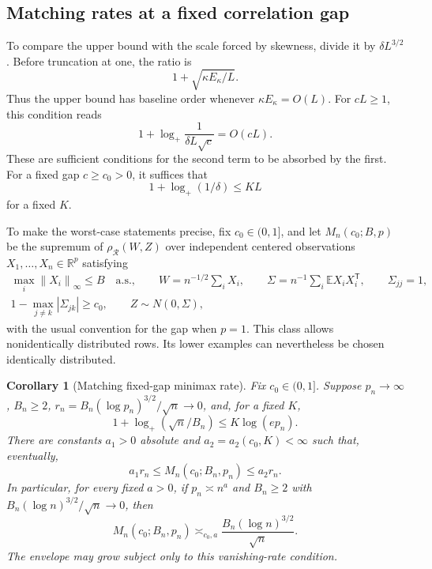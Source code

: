 \documentclass[11pt,a4paper]{article}
\newtheorem{corollary}{Corollary}
\theoremstyle{remark}
\newcommand{\E}{\mathbb E}
\newcommand{\R}{\mathbb R}
\newcommand{\norm}[1]{\left\lVert#1\right\rVert}
\newcommand{\rh}{\rho_{\mathcal R}}
\begin{document}
\subsection{Matching rates at a fixed correlation gap}
\label{opt:matching}

To compare the upper bound with the scale forced by skewness,
divide it by \(\delta L^{3/2}\). Before truncation at one, the ratio is
\[
 1+\sqrt{\kappa E_\kappa/L}.
\]
Thus the upper bound has baseline order whenever
\(\kappa E_\kappa=O(L)\). For \(cL\ge1\), this condition reads
\[
 1+\log_+\frac1{\delta L\sqrt c}=O(cL).
\]
These are sufficient conditions for the second term to be absorbed
by the first. For a fixed gap \(c\ge c_0>0\), it suffices that
\begin{equation}
 1+\log_+(1/\delta)\le K L
 \label{opt:dimension-absorbs-log}
\end{equation}
for a fixed \(K\).

To make the worst-case statements precise, fix \(c_0\in(0,1]\), and let
\(M_n(c_0;B,p)\) be the supremum of \(\rh(W,Z)\) over independent
centered observations \(X_1,\ldots,X_n\in\R^p\) satisfying
\begin{equation}
 \begin{gathered}
 \max_i\norm{X_i}_\infty\le B\quad\text{a.s.},\qquad
 W=n^{-1/2}\sum_iX_i,\qquad
 \Sigma=n^{-1}\sum_i\E X_iX_i^{\mathsf T},\qquad
 \Sigma_{jj}=1,\\
 1-\max_{j\ne k}|\Sigma_{jk}|\ge c_0,
 \qquad Z\sim N(0,\Sigma),
 \end{gathered}
 \label{opt:minimax-class}
\end{equation}
with the usual convention for the gap when \(p=1\). This class allows
nonidentically distributed rows. Its lower examples can nevertheless
be chosen identically distributed.

\begin{corollary}[Matching fixed-gap minimax rate]
\label{opt:fixed-gap-minimax}
Fix \(c_0\in(0,1]\). Suppose \(p_n\to\infty\), \(B_n\ge2\),
\(r_n=B_n(\log p_n)^{3/2}/\sqrt n\to0\), and, for a fixed \(K\),
\[
 1+\log_+(\sqrt n/B_n)\le K\log(ep_n).
\]
There are constants \(a_1>0\) absolute and
\(a_2=a_2(c_0,K)<\infty\) such that, eventually,
\begin{equation}
 a_1r_n\le M_n(c_0;B_n,p_n)\le a_2r_n.
 \label{opt:matching-minimax}
\end{equation}
In particular, for every fixed \(a>0\), if \(p_n\asymp n^a\) and
\(B_n\ge2\) with \(B_n(\log n)^{3/2}/\sqrt n\to0\), then
\begin{equation}
 M_n(c_0;B_n,p_n)\asymp_{c_0,a}
 \frac{B_n(\log n)^{3/2}}{\sqrt n}.
 \label{opt:polynomial-dimension}
\end{equation}
The envelope may grow subject only to this vanishing-rate condition.
\end{corollary}
\end{document}
